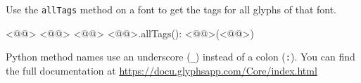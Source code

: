 \noindent Use the \texttt{allTags} method on a font to get the tags for all glyphs of that font.

\begin{RichListing}
<@@> <@@> <@@> <@@>.allTags():
    <@@>(<@@>)
\end{RichListing}

\noindent Python method names use an underscore (\texttt{\_}) instead of a colon (\texttt{:}).
You can find the full documentation at \url{https://docu.glyphsapp.com/Core/index.html}
